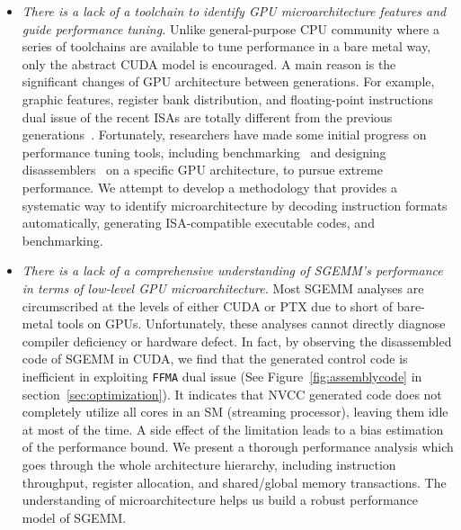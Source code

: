 \begin{itemize}
\item {\em There is a lack of a toolchain to identify GPU microarchitecture features and guide performance tuning.}
    Unlike general-purpose CPU community where a series of toolchains are available to tune performance in a bare metal
        way, only the abstract CUDA model is encouraged. A main reason is the significant changes of GPU architecture
        between generations. For example, graphic features, register bank distribution, and floating-point 
instructions dual
        issue of the recent ISAs are totally different from the previous generations~\cite{fermi}. Fortunately, researchers have made
        some initial progress on performance tuning tools, including benchmarking~\cite{mei, volkov, wong} and designing disassemblers~\cite{asfermi,bernstein2012usable,decuda,maxas} on a 
specific GPU architecture, to pursue extreme performance. We attempt to develop a methodology that provides a systematic way to identify 
microarchitecture by decoding instruction formats automatically, generating ISA-compatible executable  codes, and benchmarking.
\item {\em There is a lack of a comprehensive understanding of SGEMM's performance in terms of low-level GPU 
microarchitecture.} Most SGEMM analyses are circumscribed at the levels of either CUDA or PTX due to short of 
bare-metal tools on GPUs. Unfortunately, these analyses cannot directly diagnose compiler deficiency or hardware 
defect. In fact, by observing the disassembled code of SGEMM in CUDA, we find that the generated control code is  
inefficient in exploiting {\tt FFMA} dual issue (See Figure~\ref{fig:assemblycode} in section~\ref{sec:optimization}). 
It indicates that NVCC generated code does not 
completely utilize all cores in an SM (streaming processor), leaving 
them idle at most of the time. 
A side effect of the limitation leads to a bias estimation of the performance bound. We 
present a thorough performance analysis which goes through the whole architecture hierarchy, including instruction 
throughput, register allocation, and shared/global memory transactions. The understanding of microarchitecture helps us 
build a robust performance model of SGEMM.
\end{itemize}

